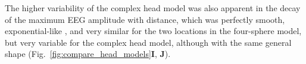 \documentclass[preprint,10pt,authoryear]{elsarticle}
\newcommand{\hlb}[2][NavyBlue]{ {\sethlcolor{#1} \hl{#2}} }
\newcommand{\hlg}[2][Emerald]{ {\sethlcolor{#1} \hl{#2}} }
\newcommand{\hlp}[2][Purple]{ {\sethlcolor{#1} \hl{#2}} }
\newcommand{\snnote}[1]{\color{white}{\hlb{SN: #1 }}\color{black}}
\newcommand{\tvnnote}[1]{\color{white}{\hlg{TVN: #1 }}\color{black}}
\newcommand{\tvntxt}[1]{{\color{Emerald}#1}}
\newcommand{\gen}[1]{\color{white}{\hlp{GTE: #1 }}\color{black}}
\begin{document}
The higher variability of the complex head model was also apparent in the decay of the maximum EEG amplitude with distance, which was perfectly smooth, exponential-like \citep{NUNEZ2006}, and very similar for the two locations in the four-sphere model, but very variable for the complex head model, although with the same general shape (Fig.~\ref{fig:compare_head_models}{\bf I}, {\bf J}). %




\end{document}
